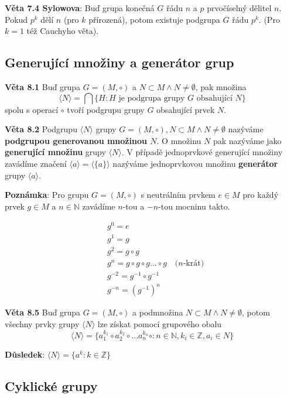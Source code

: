 \documentclass[12pt, letterpaper, twoside]{article}
\begin{document}
\textbf{Věta 7.4 Sylowova}: Buď grupa konečná $G$ řádu $n$ a $p$ prvočíselný dělitel $n$. Pokud $p^k$ dělí $n$ (pro $k$ přírozená),
 potom existuje podgrupa $G$ řádu $p^k$. (Pro $k = 1$ též Cauchyho věta).

\subsection{Generující množiny a generátor grup}

\textbf{Věta 8.1} Buď grupa $G = (M, \circ)$ a $N \subset M \wedge N \neq \emptyset$, pak množina
\[ \langle N \rangle = \bigcap\{H: \textrm{$H$ je podgrupa grupy $G$ obsahující $N$}\} \]
spolu s operací $\circ$ tvoří podgrupu grupy $G$ obsahující prvek $N$.

\textbf{Věta 8.2} Podgrupu $\langle N \rangle$ grupy $G = (M, \circ), N \subset M \wedge N \neq \emptyset$
 nazýváme \textbf{podgrupou generovanou množinou $N$}.
 O množinu $N$ pak nazýváme jako \textbf{generující množinu} grupy $\langle N \rangle$.
V případě jednoprvkové generující množiny zavádíme značení $\langle a \rangle = \langle \{ a \} \rangle$
 nazýváme jednoprvkovou množinu \textbf{generátor} grupy $\langle a \rangle$.

\textbf{Poznámka}: Pro grupu $G = (M, \circ)$ s neutrálním prvkem $e \in M$
 pro každý prvek $g \in M$ a $n \in \mathbb{N}$ zavádíme $n$-tou a $-n$-tou mocninu takto.

\begin{align*}
    &g^0 = e \\
    &g^1 = g \\
    &g^2 = g \circ g \\
    &g^n = g \circ g \circ g ... \circ g \quad \textrm{($n$-krát)} \\
    &g^{-2} = g^{-1} \circ g^{-1} \\
    &g^{-n} = (g^{-1})^{n}
\end{align*}

\textbf{Věta 8.5} Buď grupa $G = (M, \circ)$ a podmnožina $N \subset M \wedge N \neq \emptyset$,
 potom všechny prvky grupy $\langle N \rangle$ lze získat pomocí grupového obalu
\[\langle N \rangle = \{a_{1}^{k_1} \circ a_{2}^{k_2} \circ ... a_{n}^{k_n} \circ: n \in \mathbb{N}, k_i \in \mathbb{Z}, a_i \in N\} \]

\textbf{Důsledek}: $ \langle N \rangle = \{a^k: k \in \mathbb{Z}\}$

\subsection{Cyklické grupy}
\end{document}
